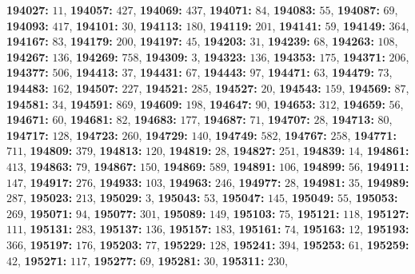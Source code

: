 \textsf{\bfseries 194027:} $11$, \textsf{\bfseries 194057:} $427$, \textsf{\bfseries 194069:} $437$, \textsf{\bfseries 194071:} $84$, \textsf{\bfseries 194083:} $55$, \textsf{\bfseries 194087:} $69$, \textsf{\bfseries 194093:} $417$, \textsf{\bfseries 194101:} $30$, \textsf{\bfseries 194113:} $180$, \textsf{\bfseries 194119:} $201$, \textsf{\bfseries 194141:} $59$, \textsf{\bfseries 194149:} $364$, \textsf{\bfseries 194167:} $83$, \textsf{\bfseries 194179:} $200$, \textsf{\bfseries 194197:} $45$, \textsf{\bfseries 194203:} $31$, \textsf{\bfseries 194239:} $68$, \textsf{\bfseries 194263:} $108$, \textsf{\bfseries 194267:} $136$, \textsf{\bfseries 194269:} $758$, \textsf{\bfseries 194309:} $3$, \textsf{\bfseries 194323:} $136$, \textsf{\bfseries 194353:} $175$, \textsf{\bfseries 194371:} $206$, \textsf{\bfseries 194377:} $506$, \textsf{\bfseries 194413:} $37$, \textsf{\bfseries 194431:} $67$, \textsf{\bfseries 194443:} $97$, \textsf{\bfseries 194471:} $63$, \textsf{\bfseries 194479:} $73$, \textsf{\bfseries 194483:} $162$, \textsf{\bfseries 194507:} $227$, \textsf{\bfseries 194521:} $285$, \textsf{\bfseries 194527:} $20$, \textsf{\bfseries 194543:} $159$, \textsf{\bfseries 194569:} $87$, \textsf{\bfseries 194581:} $34$, \textsf{\bfseries 194591:} $869$, \textsf{\bfseries 194609:} $198$, \textsf{\bfseries 194647:} $90$, \textsf{\bfseries 194653:} $312$, \textsf{\bfseries 194659:} $56$, \textsf{\bfseries 194671:} $60$, \textsf{\bfseries 194681:} $82$, \textsf{\bfseries 194683:} $177$, \textsf{\bfseries 194687:} $71$, \textsf{\bfseries 194707:} $28$, \textsf{\bfseries 194713:} $80$, \textsf{\bfseries 194717:} $128$, \textsf{\bfseries 194723:} $260$, \textsf{\bfseries 194729:} $140$, \textsf{\bfseries 194749:} $582$, \textsf{\bfseries 194767:} $258$, \textsf{\bfseries 194771:} $711$, \textsf{\bfseries 194809:} $379$, \textsf{\bfseries 194813:} $120$, \textsf{\bfseries 194819:} $28$, \textsf{\bfseries 194827:} $251$, \textsf{\bfseries 194839:} $14$, \textsf{\bfseries 194861:} $413$, \textsf{\bfseries 194863:} $79$, \textsf{\bfseries 194867:} $150$, \textsf{\bfseries 194869:} $589$, \textsf{\bfseries 194891:} $106$, \textsf{\bfseries 194899:} $56$, \textsf{\bfseries 194911:} $147$, \textsf{\bfseries 194917:} $276$, \textsf{\bfseries 194933:} $103$, \textsf{\bfseries 194963:} $246$, \textsf{\bfseries 194977:} $28$, \textsf{\bfseries 194981:} $35$, \textsf{\bfseries 194989:} $287$, \textsf{\bfseries 195023:} $213$, \textsf{\bfseries 195029:} $3$, \textsf{\bfseries 195043:} $53$, \textsf{\bfseries 195047:} $145$, \textsf{\bfseries 195049:} $55$, \textsf{\bfseries 195053:} $269$, \textsf{\bfseries 195071:} $94$, \textsf{\bfseries 195077:} $301$, \textsf{\bfseries 195089:} $149$, \textsf{\bfseries 195103:} $75$, \textsf{\bfseries 195121:} $118$, \textsf{\bfseries 195127:} $111$, \textsf{\bfseries 195131:} $283$, \textsf{\bfseries 195137:} $136$, \textsf{\bfseries 195157:} $183$, \textsf{\bfseries 195161:} $74$, \textsf{\bfseries 195163:} $12$, \textsf{\bfseries 195193:} $366$, \textsf{\bfseries 195197:} $176$, \textsf{\bfseries 195203:} $77$, \textsf{\bfseries 195229:} $128$, \textsf{\bfseries 195241:} $394$, \textsf{\bfseries 195253:} $61$, \textsf{\bfseries 195259:} $42$, \textsf{\bfseries 195271:} $117$, \textsf{\bfseries 195277:} $69$, \textsf{\bfseries 195281:} $30$, \textsf{\bfseries 195311:} $230$, 
